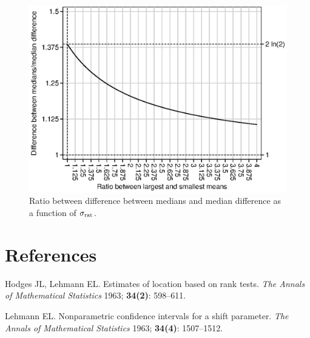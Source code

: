 \documentclass[a4paper]{article}      %
\begin{document}
\begin{figure}[tbp]
\caption{Ratio between difference between medians and median difference as a function of $\sigma_{\rm rat}$.}
\label{figure:figseq2}
\includegraphics{figseq2.eps}
\end{figure}

\section{References}

{\parindent=0pt

\smallskip

Hodges JL, Lehmann EL. Estimates of location based on rank tests.
\textsl{The Annals of Mathematical Statistics} 1963; \textbf{34(2)}: 598--611.

Lehmann EL. Nonparametric confidence intervals for a shift parameter.
\textsl{The Annals of Mathematical Statistics} 1963; \textbf{34(4)}: 1507--1512.

}
\end{document}
